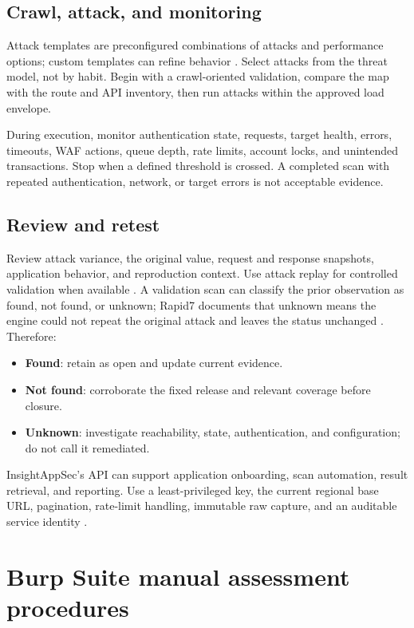 \documentclass[11pt,letterpaper]{article}
\newcommand{\status}[1]{\textsf{\textbf{#1}}}
\begin{document}
\subsection{Crawl, attack, and monitoring}

Attack templates are preconfigured combinations of attacks and performance options; custom templates can refine behavior \citep{rapid7templates}. Select attacks from the threat model, not by habit. Begin with a crawl-oriented validation, compare the map with the route and API inventory, then run attacks within the approved load envelope.

During execution, monitor authentication state, requests, target health, errors, timeouts, WAF actions, queue depth, rate limits, account locks, and unintended transactions. Stop when a defined threshold is crossed. A completed scan with repeated authentication, network, or target errors is not acceptable evidence.

\subsection{Review and retest}

Review attack variance, the original value, request and response snapshots, application behavior, and reproduction context. Use attack replay for controlled validation when available \citep{rapid7review,rapid7retest}. A validation scan can classify the prior observation as found, not found, or unknown; Rapid7 documents that unknown means the engine could not repeat the original attack and leaves the status unchanged \citep{rapid7scan}. Therefore:

\begin{itemize}
  \item \status{Found}: retain as open and update current evidence.
  \item \status{Not found}: corroborate the fixed release and relevant coverage before closure.
  \item \status{Unknown}: investigate reachability, state, authentication, and configuration; do not call it remediated.
\end{itemize}

InsightAppSec's API can support application onboarding, scan automation, result retrieval, and reporting. Use a least-privileged key, the current regional base URL, pagination, rate-limit handling, immutable raw capture, and an auditable service identity \citep{rapid7api}.

\section{Burp Suite manual assessment procedures}
\end{document}
